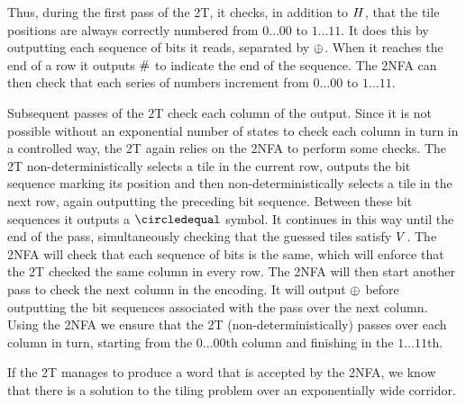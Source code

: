 Thus, during the first pass of the 2T, it checks, in addition to $H$, that the tile positions are always correctly numbered from $0\ldots00$ to $1\ldots11$.
It does this by outputting each sequence of bits it reads, separated by $\oplus$.
When it reaches the end of a row it outputs $\#$ to indicate the end of the sequence.
The 2NFA can then check that each series of numbers increment from $0\ldots00$ to $1\ldots11$.

Subsequent passes of the 2T check each column of the output.
Since it is not possible without an exponential number of states to check each column in turn in a controlled way, the 2T again relies on the 2NFA to perform some checks.
The 2T non-deterministically selects a tile in the current row, outputs the bit sequence marking its position and then non-deterministically selects a tile in the next row, again outputting the preceding bit sequence.
Between these bit sequences it outputs a $\numeq$ symbol.
It continues in this way until the end of the pass, simultaneously checking that the guessed tiles satisfy $V$.
The 2NFA will check that each sequence of bits is the same, which will enforce that the 2T checked the same column in every row.
The 2NFA will then start another pass to check the next column in the encoding.
It will output $\oplus$ before outputting the bit sequences associated with the pass over the next column.
Using the 2NFA we ensure that the 2T (non-deterministically) passes over each column in turn, starting from the $0\ldots00$th column and finishing in the $1\ldots11$th.

If the 2T manages to produce a word that is accepted by the 2NFA, we know that there is a solution to the tiling problem over an exponentially wide corridor.

